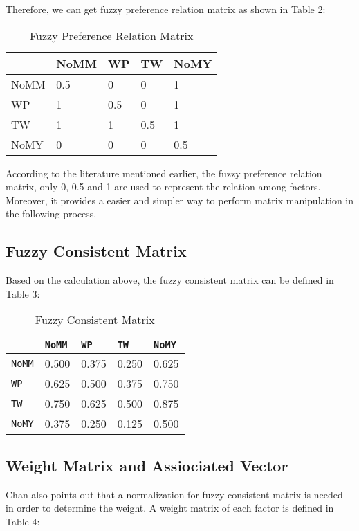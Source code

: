 \documentclass[12pt,a4paper]{article}
\begin{document}
	Therefore, we can get fuzzy preference relation matrix as shown in Table 2:
	
    \begin{table}[h]
        \centering
        \caption{Fuzzy Preference Relation Matrix}
        \begin{tabular}{lllll}
            & NoMM & WP & TW & NoMY \\
         \hline\hline
        NoMM & 0.5 & 0 & 0 & 1 \\
        WP & 1 & 0.5 & 0 & 1 \\
        TW & 1 & 1 & 0.5 & 1 \\
        NoMY & 0 & 0 & 0 & 0.5\\
        \hline\hline
        \end{tabular}
    \end{table}
    
    According to the literature mentioned earlier, the fuzzy preference relation matrix, only 0, 0.5 and 1 are used to represent the relation among factors. Moreover, it provides a easier and simpler way to perform matrix manipulation in the following process.
    
\subsection{Fuzzy Consistent Matrix}
	
    Based on the calculation above, the fuzzy consistent matrix can be defined in Table 3:
    

\begin{table}[h]
    \centering
    \caption{Fuzzy Consistent Matrix}
    \label{my-label}
    \begin{tabular}{lllll}
    \hline
     & \texttt{NoMM} & \texttt{WP} & \texttt{TW} & \texttt{NoMY} \\
     \hline\hline
    \texttt{NoMM} & 0.500 & 0.375 & 0.250 & 0.625 \\
    \texttt{WP} & 0.625 & 0.500 & 0.375 & 0.750 \\
    \texttt{TW} & 0.750 & 0.625 & 0.500 & 0.875 \\
    \texttt{NoMY} & 0.375 & 0.250 & 0.125 & 0.500 \\
    \hline\hline
    \end{tabular}
\end{table}


\subsection{Weight Matrix and Assiociated Vector}
    Chan also points out that a normalization for fuzzy consistent matrix is needed in order to determine the weight. A weight matrix of each factor is defined in Table 4:
    
\end{document}
